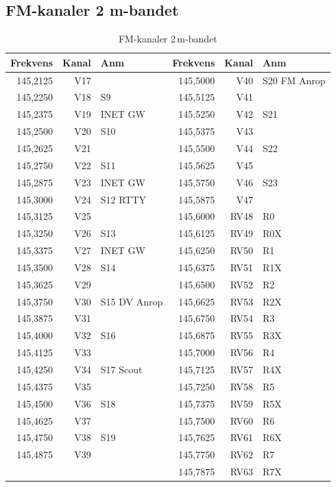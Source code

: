{\subsection{FM-kanaler 2 m-bandet}

\begin{longtable}{rrl|rrl}
\caption{FM-kanaler 2\,m-bandet}\\
\textbf{Frekvens} & \textbf{Kanal} & \textbf{Anm} &
\textbf{Frekvens} & \textbf{Kanal} & \textbf{Anm} \\ \hline

145,2125 & V17 &              & 145,5000 & V40  & S20  FM Anrop \\
145,2250 & V18 & S9           & 145,5125 & V41  &               \\
145,2375 & V19 & INET GW      & 145,5250 & V42  & S21           \\
145,2500 & V20 & S10          & 145,5375 & V43  &               \\
145,2625 & V21 &              & 145,5500 & V44  & S22           \\
145,2750 & V22 & S11          & 145,5625 & V45  &               \\
145,2875 & V23 & INET GW      & 145,5750 & V46  & S23           \\
145,3000 & V24 & S12  RTTY    & 145,5875 & V47  &               \\
145,3125 & V25 &              & 145,6000 & RV48 & R0            \\
145,3250 & V26 & S13          & 145,6125 & RV49 & R0X           \\
145,3375 & V27 & INET GW      & 145,6250 & RV50 & R1            \\
145,3500 & V28 & S14          & 145,6375 & RV51 & R1X           \\
145,3625 & V29 &              & 145,6500 & RV52 & R2            \\
145,3750 & V30 & S15 DV Anrop & 145,6625 & RV53 & R2X           \\
145,3875 & V31 &              & 145,6750 & RV54 & R3            \\
145,4000 & V32 & S16          & 145,6875 & RV55 & R3X           \\
145,4125 & V33 &              & 145,7000 & RV56 & R4            \\
145,4250 & V34 & S17 Scout    & 145,7125 & RV57 & R4X           \\
145,4375 & V35 &              & 145,7250 & RV58 & R5            \\
145,4500 & V36 & S18          & 145,7375 & RV59 & R5X           \\
145,4625 & V37 &              & 145,7500 & RV60 & R6            \\
145,4750 & V38 & S19          & 145,7625 & RV61 & R6X           \\
145,4875 & V39 &              & 145,7750 & RV62 & R7            \\
         &     &              & 145,7875 & RV63 & R7X
\end{longtable}

}
